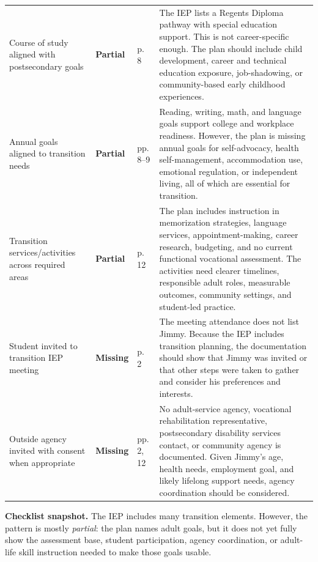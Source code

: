 \documentclass[11pt]{article}
\newcommand{\Partial}{\textbf{\textcolor{PartialOrange}{Partial}}}
\newcommand{\Missing}{\textbf{\textcolor{MissingRed}{Missing}}}
\begin{document}
\begin{longtable}{L{0.16\textwidth} L{0.055\textwidth} L{0.07\textwidth} L{0.63\textwidth}}
Course of study aligned with postsecondary goals & \Partial & p. 8 & The IEP lists a Regents Diploma pathway with special education support. This is not career-specific enough. The plan should include child development, career and technical education exposure, job-shadowing, or community-based early childhood experiences. \\

Annual goals aligned to transition needs & \Partial & pp. 8--9 & Reading, writing, math, and language goals support college and workplace readiness. However, the plan is missing annual goals for self-advocacy, health self-management, accommodation use, emotional regulation, or independent living, all of which are essential for transition. \\

Transition services/activities across required areas & \Partial & p. 12 & The plan includes instruction in memorization strategies, language services, appointment-making, career research, budgeting, and no current functional vocational assessment. The activities need clearer timelines, responsible adult roles, measurable outcomes, community settings, and student-led practice. \\

Student invited to transition IEP meeting & \Missing & p. 2 & The meeting attendance does not list Jimmy. Because the IEP includes transition planning, the documentation should show that Jimmy was invited or that other steps were taken to gather and consider his preferences and interests. \\

Outside agency invited with consent when appropriate & \Missing & pp. 2, 12 & No adult-service agency, vocational rehabilitation representative, postsecondary disability services contact, or community agency is documented. Given Jimmy's age, health needs, employment goal, and likely lifelong support needs, agency coordination should be considered. \\

\bottomrule
\end{longtable}
\normalsize

\begin{TakeawayBox}
\textbf{Checklist snapshot.} The IEP includes many transition elements. However, the pattern is mostly \textit{partial}: the plan names adult goals, but it does not yet fully show the assessment base, student participation, agency coordination, or adult-life skill instruction needed to make those goals usable.
\end{TakeawayBox}
\end{document}
